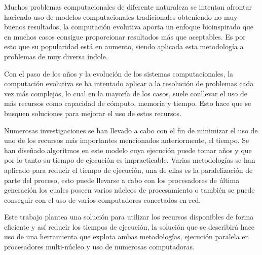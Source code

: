 Muchos problemas computacionales de diferente naturaleza se intentan afrontar haciendo uso de modelos computacionales tradicionales obteniendo no muy buenos resultados, la computación evolutiva aporta un enfoque bioinspirado que en muchos casos consigue proporcionar resultados m\'as que aceptables. Es por esto que su popularidad est\'a en aumento, siendo aplicada esta metodolog\'ia a problemas de muy diversa \'indole.

Con el paso de los a\~nos y la evoluci\'on de los sistemas computacionales, la computaci\'on evolutiva se ha intentado aplicar a la resoluci\'on de problemas cada vez m\'as complejos, lo cual en la mayor\'ia de los casos, suele conllevar el uso de m\'as recursos como capacidad de c\'omputo, memoria y tiempo. Esto hace que se busquen soluciones para mejorar el uso de estos recursos.

Numerosas investigaciones se han llevado a cabo con el fin de minimizar el uso de uno de los recursos m\'as importantes mencionados anteriormente, el tiempo. Se han dise\~nado algoritmos en este modelo cuya ejecuci\'on puede tomar a\~nos y que por lo tanto su tiempo de ejecuci\'on es impracticable. Varias metodolog\'ias se han aplicado para reducir el tiempo de ejecuci\'on, una de ellas es la paralelizaci\'on de parte del proceso, esto puede llevarse a cabo con los procesadores de \'ultima generaci\'on los cuales poseen varios n\'ucleos de procesamiento o tambi\'en se puede conseguir con el uso de varios computadores conectados en red.

Este trabajo plantea una soluci\'on para utilizar los recursos disponibles de forma eficiente y as\'i reducir los tiempos de ejecuci\'on, la soluci\'on que se describir\'a hace uso de una herramienta que explota ambas metodolog\'ias, ejecuci\'on paralela en procesadores multi-n\'ucleo y uso de numerosas computadoras.